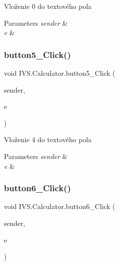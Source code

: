 Vloženie \textquotesingle{}0\textquotesingle{} do textového pola 


\begin{DoxyParams}{Parameters}
{\em sender} & \\
\hline
{\em e} & \\
\hline
\end{DoxyParams}
\mbox{\label{class_i_v_s_1_1_calculator_a7ea090e719a196447aadfd4a065a42f0}} 
\subsubsection{\texorpdfstring{button5\+\_\+\+Click()}{button5\_Click()}}
{\footnotesize\ttfamily void I\+V\+S.\+Calculator.\+button5\+\_\+\+Click (\begin{DoxyParamCaption}\item[{object}]{sender,  }\item[{Event\+Args}]{e }\end{DoxyParamCaption})\hspace{0.3cm}{\ttfamily [protected]}}



Vloženie \textquotesingle{}4\textquotesingle{} do textového pola 


\begin{DoxyParams}{Parameters}
{\em sender} & \\
\hline
{\em e} & \\
\hline
\end{DoxyParams}
\mbox{\label{class_i_v_s_1_1_calculator_a061c919ebdc08c877ae00f4ce1697739}} 
\subsubsection{\texorpdfstring{button6\+\_\+\+Click()}{button6\_Click()}}
{\footnotesize\ttfamily void I\+V\+S.\+Calculator.\+button6\+\_\+\+Click (\begin{DoxyParamCaption}\item[{object}]{sender,  }\item[{Event\+Args}]{e }\end{DoxyParamCaption})\hspace{0.3cm}{\ttfamily [protected]}}



